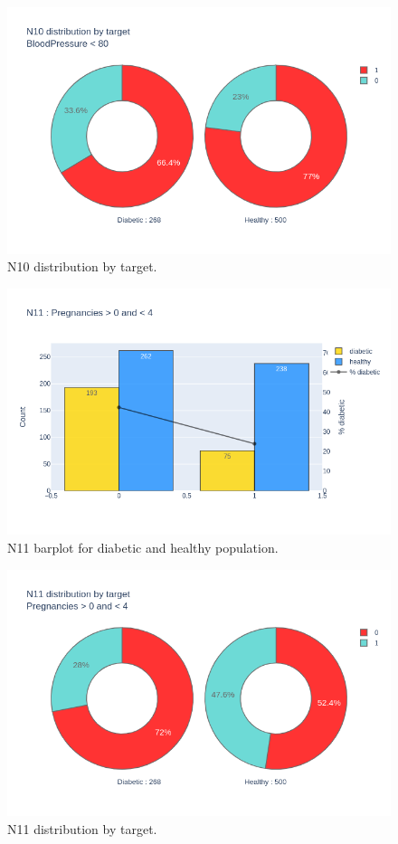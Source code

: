 \documentclass[12pt]{article}
\begin{document}
\begin{figure}[ht]
\centering
\includegraphics[width=1\textwidth]{newplot(35).png}
\caption{\label{fig:44} N10 distribution by target.}
\end{figure}

\begin{figure}[ht]
\centering
\includegraphics[width=1\textwidth]{newplot(37).png}
\caption{\label{fig:45} N11 barplot for diabetic and healthy population.}
\end{figure}

\begin{figure}[ht]
\centering
\includegraphics[width=1\textwidth]{newplot(38).png}
\caption{\label{fig:46} N11 distribution by target.}
\end{figure}
\end{document}
